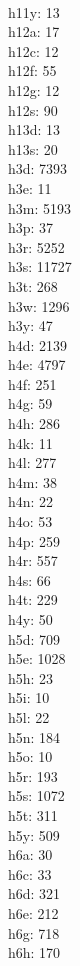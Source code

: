 \begin{multicols}{8}
  \\ h11y: 13
  \\ h12a: 17
  \\ h12c: 12
  \\ h12f: 55
  \\ h12g: 12
  \\ h12s: 90
  \\ h13d: 13
  \\ h13s: 20
  \\ h3d: 7393
  \\ h3e: 11
  \\ h3m: 5193
  \\ h3p: 37
  \\ h3r: 5252
  \\ h3s: 11727
  \\ h3t: 268
  \\ h3w: 1296
  \\ h3y: 47
  \\ h4d: 2139
  \\ h4e: 4797
  \\ h4f: 251
  \\ h4g: 59
  \\ h4h: 286
  \\ h4k: 11
  \\ h4l: 277
  \\ h4m: 38
  \\ h4n: 22
  \\ h4o: 53
  \\ h4p: 259
  \\ h4r: 557
  \\ h4s: 66
  \\ h4t: 229
  \\ h4y: 50
  \\ h5d: 709
  \\ h5e: 1028
  \\ h5h: 23
  \\ h5i: 10
  \\ h5l: 22
  \\ h5n: 184
  \\ h5o: 10
  \\ h5r: 193
  \\ h5s: 1072
  \\ h5t: 311
  \\ h5y: 509
  \\ h6a: 30
  \\ h6c: 33
  \\ h6d: 321
  \\ h6e: 212
  \\ h6g: 718
  \\ h6h: 170

\end{multicols}

